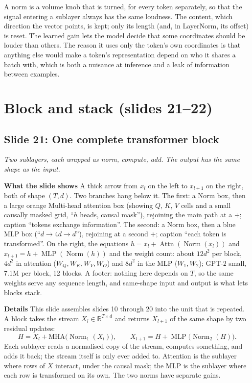 \documentclass[11pt,letterpaper]{article}
\newcommand{\setstage}[1]{\colorlet{stagec}{#1}}
\newcommand{\slide}[3]{%
  \subsection[Slide #1: #2]{Slide #1: #2}%
  {\color{muted}\itshape #3\par}\medskip}
\newcommand{\para}[1]{\medskip\noindent\textbf{#1}\quad}
\newenvironment{intuition}{\begin{tcolorbox}[intuitionbox]}{\end{tcolorbox}}
\DeclareMathOperator{\Norm}{Norm}
\DeclareMathOperator{\Attn}{Attn}
\DeclareMathOperator{\MLP}{MLP}
\begin{document}
\begin{intuition}
A norm is a volume knob that is turned, for every token separately, so that the signal entering a sublayer always has the same loudness. The content, which direction the vector points, is kept; only its length (and, in LayerNorm, its offset) is reset. The learned gain lets the model decide that some coordinates should be louder than others. The reason it uses only the token's own coordinates is that anything else would make a token's representation depend on who it shares a batch with, which is both a nuisance at inference and a leak of information between examples.
\end{intuition}

\setstage{ink}
\section{Block and stack (slides 21--22)}

\slide{21}{One complete transformer block}{Two sublayers, each wrapped as norm, compute, add. The output has the same shape as the input.}

\para{What the slide shows} A thick arrow from $x_l$ on the left to $x_{l+1}$ on the right, both of shape $(T,d)$. Two branches hang below it. The first: a Norm box, then a large orange Multi-head attention box (showing $Q$, $K$, $V$ cells and a small causally masked grid, ``$h$ heads, causal mask''), rejoining the main path at a $+$; caption ``tokens exchange information''. The second: a Norm box, then a blue MLP box (``$d\to4d\to d$''), rejoining at a second $+$; caption ``each token is transformed''. On the right, the equations $h=x_l+\Attn(\Norm(x_l))$ and $x_{l+1}=h+\MLP(\Norm(h))$ and the weight count: about $12d^2$ per block, $4d^2$ in attention ($W_Q,W_K,W_V,W_O$) and $8d^2$ in the MLP ($W_1,W_2$); GPT-2 small, 7.1M per block, 12 blocks. A footer: nothing here depends on $T$, so the same weights serve any sequence length, and same-shape input and output is what lets blocks stack.

\para{Details} This slide assembles slides 10 through 20 into the unit that is repeated. A block takes the stream $X_l\in\mathbb{R}^{T\times d}$ and returns $X_{l+1}$ of the same shape by two residual updates:
\[
H=X_l+\mathrm{MHA}\big(\Norm_1(X_l)\big),\qquad X_{l+1}=H+\MLP\big(\Norm_2(H)\big).
\]
Each sublayer reads a normalised copy of the stream, computes something, and adds it back; the stream itself is only ever added to. Attention is the sublayer where rows of $X$ interact, under the causal mask; the MLP is the sublayer where each row is transformed on its own. The two norms have separate gains.
\end{document}
